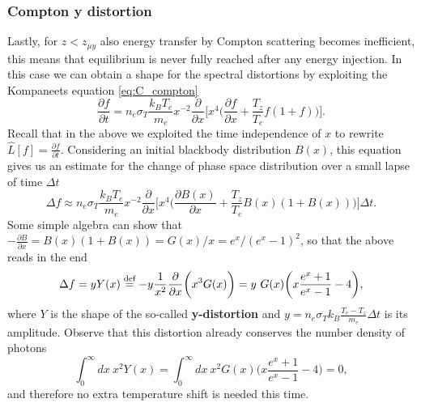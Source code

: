 \subsubsection{Compton y distortion}
Lastly, for $z<z_{\mu y}$ also energy transfer by Compton scattering becomes inefficient, this means that equilibrium is never fully reached after any energy injection. In this case we can obtain a shape for the spectral distortions by exploiting the Kompaneets equation \eqref{eq:C_compton}
$$\frac{\partial f}{\partial t}=n_e\sigma_T\frac{k_BT_e}{m_e}x^{-2}\frac{\partial}{\partial x}\bigg[x^4\bigg(\frac{\partial f}{\partial x}+\frac{T_z}{T_e}f(1+f)\bigg)\bigg].$$ Recall that in the above we exploited the time independence of $x$ to rewrite $\hat{L}[f]=\frac{\partial f}{\partial t}.$
Considering an initial blackbody distribution $B(x)$, this equation gives us an estimate for the change of phase space distribution over a small lapse of time $\Delta t$ $$\Delta f\approx n_e\sigma_T\frac{k_BT_e}{m_e}x^{-2}\frac{\partial}{\partial x}\bigg[x^4\bigg(\frac{\partial B(x)}{\partial x}+\frac{T_z}{T_e}B(x)(1+B(x))\bigg)\bigg]\Delta t.$$
Some simple algebra can show that $-\frac{\partial B}{\partial x}=B(x)(1+B(x))={G(x)}/{x}={e^x}/{(e^x-1)^2}$, so that the above reads in the end
\begin{equation}
    \label{eq:SD_y_distortion}
    \Delta f=yY(x)\defeq -y\frac{1}{x^2}\frac{\partial}{\partial x}\bigg(x^3G(x)\bigg)=y\ G(x)\bigg(x\frac{e^x+1}{e^x-1}-4\bigg),
\end{equation}
where $Y$ is the shape of the so-called \textbf{y-distortion} and $y=n_e\sigma_Tk_B\frac{T_e-T_z}{m_e}\Delta t$ is its amplitude. Observe that this distortion already conserves the number density of photons
$$\int_0^\infty dx\ x^2Y(x)=\int_0^\infty dx\ x^2G(x)\bigg(x\frac{e^x+1}{e^x-1}-4\bigg)=0,$$
and therefore no extra temperature shift is needed this time.

